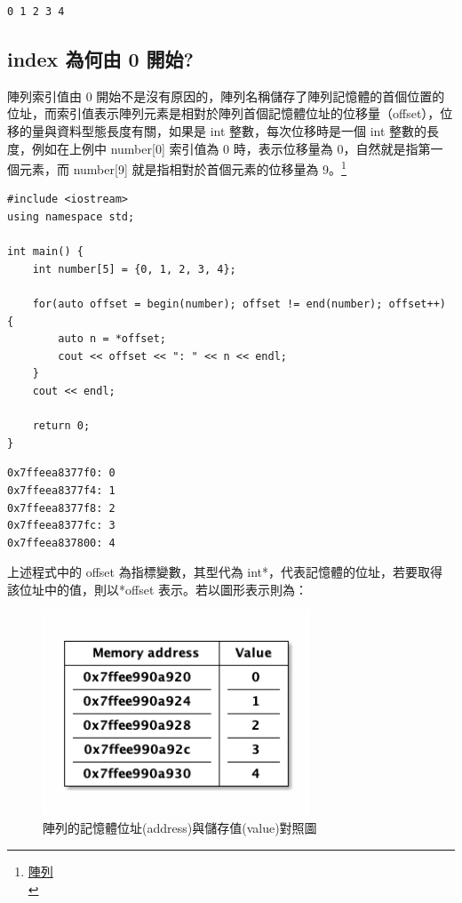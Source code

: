 \documentclass[a4paper,12pt]{article}
\begin{document}
\begin{verbatim}
0 1 2 3 4
\end{verbatim}

\subsection{index 為何由 0 開始?}
\label{sec:org3b58370}
陣列索引值由 0 開始不是沒有原因的，陣列名稱儲存了陣列記憶體的首個位置的位址，而索引值表示陣列元素是相對於陣列首個記憶體位址的位移量（offset），位移的量與資料型態長度有關，如果是 int 整數，每次位移時是一個 int 整數的長度，例如在上例中 number[0] 索引值為 0 時，表示位移量為 0，自然就是指第一個元素，而 number[9] 就是指相對於首個元素的位移量為 9。\footnote{\href{https://openhome.cc/Gossip/CppGossip/OneDimArray.html}{陣列}\\}\\

\lstset{breaklines=true,language=cpp,label= ,caption= ,captionpos=b,firstnumber=1,numbers=left}
\begin{lstlisting}
#include <iostream>
using namespace std;

int main() {
    int number[5] = {0, 1, 2, 3, 4};

    for(auto offset = begin(number); offset != end(number); offset++) {
        auto n = *offset;
        cout << offset << ": " << n << endl;
    }
    cout << endl;

    return 0;
}
\end{lstlisting}

\begin{verbatim}
0x7ffeea8377f0: 0
0x7ffeea8377f4: 1
0x7ffeea8377f8: 2
0x7ffeea8377fc: 3
0x7ffeea837800: 4
\end{verbatim}

上述程式中的 offset 為指標變數，其型代為 int*，代表記憶體的位址，若要取得該位址中的值，則以*offset 表示。若以圖形表示則為：\\
\begin{figure}[htbp]
\centering
\includegraphics[width=300]{images/address.png}
\caption{\label{fig:Memory-Value}陣列的記憶體位址(address)與儲存值(value)對照圖}
\end{figure}
\end{document}
